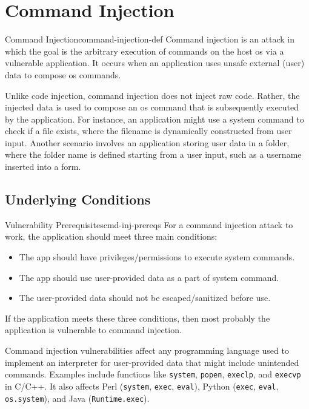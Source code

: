 \chapter{Command Injection}
\label{ch:command_injection}

\begin{concept}{Command Injection}{command-injection-def}
    Command injection is an attack in which the goal is the arbitrary execution of commands on the host \gls{os} via a vulnerable application. It occurs when an application uses unsafe external (user) data to compose \gls{os} commands.
\end{concept}

Unlike code injection, command injection does not inject raw code. Rather, the injected data is used to compose an \gls{os} command that is subsequently executed by the application. For instance, an application might use a system command to check if a file exists, where the filename is dynamically constructed from user input. Another scenario involves an application storing user data in a folder, where the folder name is defined starting from a user input, such as a username inserted into a form. 

\section{Underlying Conditions}

\begin{observation}{Vulnerability Prerequisites}{cmd-inj-prereqs}
    For a command injection attack to work, the application should meet three main conditions:
    \begin{itemize}
        \item The app should have privileges/permissions to execute system commands.
        \item The app should use user-provided data as a part of system command.
        \item The user-provided data should not be escaped/sanitized before use.
    \end{itemize}
    If the application meets these three conditions, then most probably the application is vulnerable to command injection.
\end{observation}

Command injection vulnerabilities affect any programming language used to implement an interpreter for user-provided data that might include unintended commands. Examples include functions like \texttt{system}, \texttt{popen}, \texttt{execlp}, and \texttt{execvp} in C/C++. It also affects Perl (\texttt{system}, \texttt{exec}, \texttt{eval}), Python (\texttt{exec}, \texttt{eval}, \texttt{os.system}), and Java (\texttt{Runtime.exec}).


